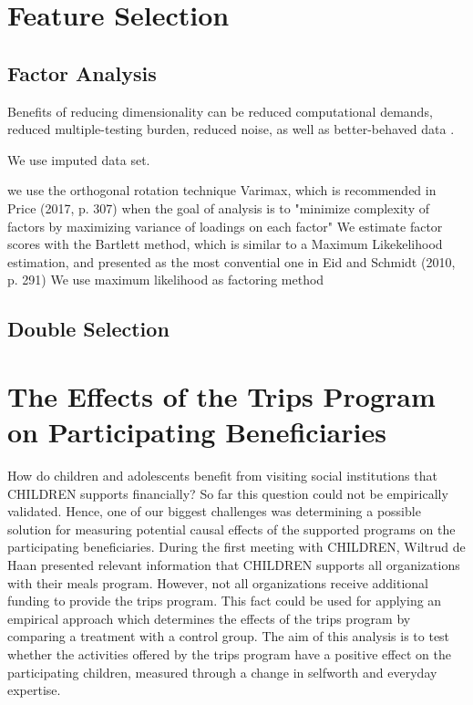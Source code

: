 \documentclass[12pt, a4paper, titlepage]{article}\usepackage[]{graphicx}\usepackage[]{color}
\begin{document}
\section{Feature Selection}

\subsection{Factor Analysis}

Benefits of reducing dimensionality can be reduced computational demands, reduced multiple-testing burden, reduced noise, as well as better-behaved data \cite{Millstein.2020, p.677}.

We use imputed data set.

we use the orthogonal rotation technique Varimax, which is recommended in Price (2017, p. 307) when the goal of analysis is to "minimize complexity of factors by maximizing variance of loadings on each factor" 
We estimate factor scores with the Bartlett method, which is similar to a Maximum Likekelihood estimation, and presented as the most convential one in Eid and Schmidt (2010, p. 291)
We use maximum likelihood as factoring method



\subsection{Double Selection}

\section{The Effects of the Trips Program on Participating Beneficiaries}

How do children and adolescents benefit from visiting social institutions that CHILDREN supports financially? So far this question could not be empirically validated. Hence, one of our biggest challenges was determining a possible solution for measuring potential causal effects of the supported programs on the participating beneficiaries. During the first meeting with CHILDREN, Wiltrud de Haan presented relevant information that CHILDREN supports all organizations with their meals program. However, not all organizations receive additional funding to provide the trips program. This fact could be used for applying an empirical approach which determines the effects of the trips program by comparing a treatment with a control group. The aim of this analysis is to test whether the activities offered by the trips program have a positive effect on the participating children, measured through a change in selfworth and everyday expertise. 
\end{document}
